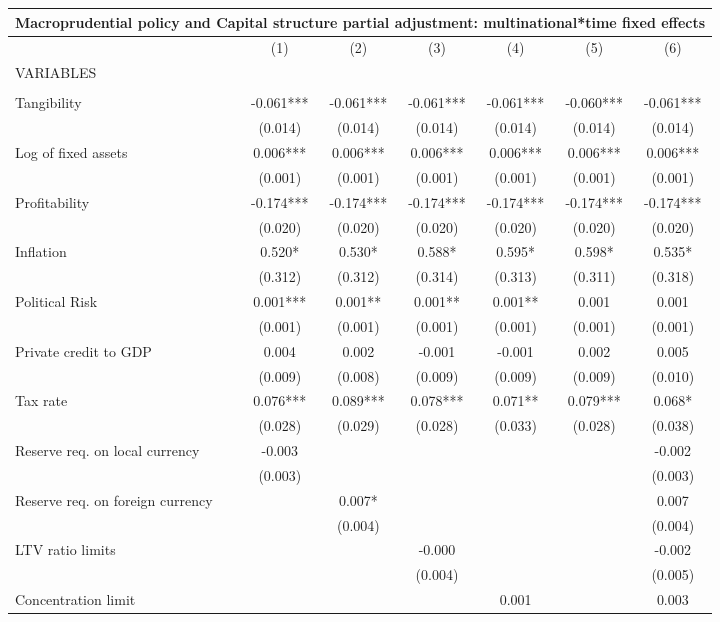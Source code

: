 \begin{tabular}{lcccccc}
\multicolumn{7}{c}{Macroprudential policy and Capital structure partial adjustment: multinational*time fixed effects} \\ \hline
 & (1) & (2) & (3) & (4) & (5) & (6) \\
VARIABLES &  &  &  &  &  &  \\ \hline
 &  &  &  &  &  &  \\
Tangibility & -0.061*** & -0.061*** & -0.061*** & -0.061*** & -0.060*** & -0.061*** \\
 & (0.014) & (0.014) & (0.014) & (0.014) & (0.014) & (0.014) \\
Log of fixed assets & 0.006*** & 0.006*** & 0.006*** & 0.006*** & 0.006*** & 0.006*** \\
 & (0.001) & (0.001) & (0.001) & (0.001) & (0.001) & (0.001) \\
Profitability & -0.174*** & -0.174*** & -0.174*** & -0.174*** & -0.174*** & -0.174*** \\
 & (0.020) & (0.020) & (0.020) & (0.020) & (0.020) & (0.020) \\
Inflation & 0.520* & 0.530* & 0.588* & 0.595* & 0.598* & 0.535* \\
 & (0.312) & (0.312) & (0.314) & (0.313) & (0.311) & (0.318) \\
Political Risk & 0.001*** & 0.001** & 0.001** & 0.001** & 0.001 & 0.001 \\
 & (0.001) & (0.001) & (0.001) & (0.001) & (0.001) & (0.001) \\
Private credit to GDP & 0.004 & 0.002 & -0.001 & -0.001 & 0.002 & 0.005 \\
 & (0.009) & (0.008) & (0.009) & (0.009) & (0.009) & (0.010) \\
Tax rate & 0.076*** & 0.089*** & 0.078*** & 0.071** & 0.079*** & 0.068* \\
 & (0.028) & (0.029) & (0.028) & (0.033) & (0.028) & (0.038) \\
Reserve req. on local currency & -0.003 &  &  &  &  & -0.002 \\
 & (0.003) &  &  &  &  & (0.003) \\
Reserve req. on foreign currency &  & 0.007* &  &  &  & 0.007 \\
 &  & (0.004) &  &  &  & (0.004) \\
LTV ratio limits &  &  & -0.000 &  &  & -0.002 \\
 &  &  & (0.004) &  &  & (0.005) \\
Concentration limit &  &  &  & 0.001 &  & 0.003 \\

\end{tabular}
